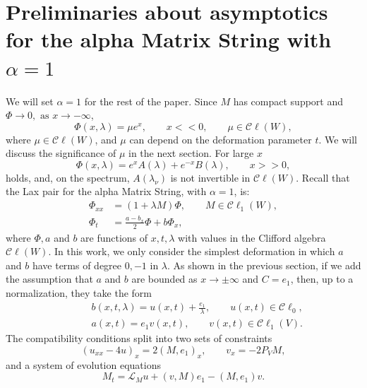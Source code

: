\documentclass[10pt,a4paper]{article}
\numberwithin{equation}{section}
\theoremstyle{plain}
\theoremstyle{definition}
\newcommand\Cl{\mathcal{C}\ell}
\renewcommand{\l}{\lambda}
\begin{document}
\section{Preliminaries about asymptotics for the alpha Matrix String with $\alpha=1$} 
We will set $\alpha=1$ for the rest of the paper.  
Since $M$ has compact support and $\Phi \rightarrow 0, \text{ as } x\rightarrow -\infty$, 
\begin{equation} \label{eq:Phiminus} 
\Phi(x,\lambda)=\mu e^x, \qquad x<< 0, \qquad \mu \in \Cl(W), 
\end{equation} 
where  $\mu \in \Cl(W)$, and $\mu$ can depend on the deformation parameter $t$.  We will discuss the significance of $\mu$ in the next section.  
For large $x$ 
\begin{equation} \label{eq:Phiplus}
\Phi(x, \lambda)=e^{x} A(\lambda)+e^{-x} B(\lambda), \qquad x>> 0, 
\end{equation} 
  holds, and, on the spectrum, $A(\lambda_\nu)$ is not invertible in $\Cl (W)$.  
Recall that the Lax pair for the alpha Matrix String, with $\alpha=1$,  is: 
\begin{subequations} 
\begin{align} 
\Phi_{xx}&=(1 +\lambda M) \Phi, \qquad M \in \Cl_1(W), \label{eq:x-Lax-DS} \\
\Phi_t&=\frac{a-b_x}{2}\Phi+b\Phi_x,  \label{eq:t-Lax-DS}
\end{align}
\end{subequations} 
where $\Phi, a$ and $b$ are functions of $x,t, \lambda$  with values in the Clifford algebra $\Cl(W)$.  In this work, we only consider the simplest deformation in which $a$ and $b$ have terms 
of degree $0, -1$ in $\lambda$.  As shown in the previous section, if we add the 
assumption that $a$ and $b$ are bounded  as $x\to\pm\infty$ and $C=e_1$, then,
up to a normalization, they take the form
\begin{align} \label{eq:abalphaMS}
&b(x,t,\l)=u(x,t)+\frac {e_1}{\l} ,\qquad u(x,t)\in \Cl_0, \\
\qquad 
&a(x,t)=e_1 v(x,t), \qquad v(x,t) \in \Cl_1(V).  
\end{align} 
The compatibility conditions split into two sets of constraints 
\begin{equation*} 
(u_{xx}-4 u)_x=2(M,e_1)_x,  \qquad v_x=-2P_V M, 
\end{equation*} 
and a system of evolution equations
\begin{equation} \label{eq:evolalphaMS} 
M_t=\mathcal{L}_M u+(v,M)e_1-(M,e_1) v. 
\end{equation} 
\end{document}
